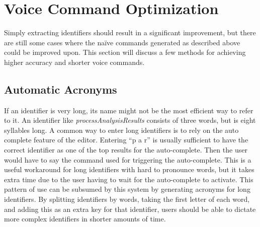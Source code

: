 \documentclass[../thesis.tex]{subfiles}
\begin{document}


\section{Voice Command Optimization}
Simply extracting identifiers should result in a significant improvement, but there are still some cases
where the naïve commands generated as described above could be improved upon.
This section will discuss a few methods for achieving higher accuracy and shorter voice commands.

\subsection{Automatic Acronyms}\label{automatic_acronyms}
If an identifier is very long, its name might not be the most efficient way to refer to it.
An identifier like \textit{processAnalysisResults} consists of three words, but is eight syllables long.
A common way to enter long identifiers is to rely on the auto complete feature of the editor.
Entering ``p a r'' is usually sufficient to have the correct identifier as one of the top results for the auto-complete.
Then the user would have to say the command used for triggering the auto-complete.
This is a useful workaround for long identifiers with hard to pronounce words, but it takes extra time
due to the user having to wait for the auto-complete to activate.
This pattern of use can be subsumed by this system by generating acronyms for long identifiers.
By splitting identifiers by words, taking the first letter of each word, and adding this as an extra key
for that identifier, users should be able to dictate more complex identifiers in shorter amounts of time.
\end{document}
